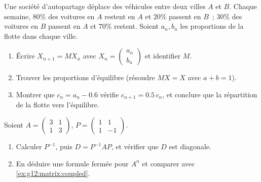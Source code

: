 \begin{exercise}[$\star\star$]\label{exo:g12:matrix:7}
Une société d'autopartage déplace des véhicules entre deux villes $A$ et
$B$. Chaque semaine, $80\%$ des voitures en $A$ restent en $A$ et $20\%$
passent en $B$~; $30\%$ des voitures en $B$ passent en $A$ et $70\%$ restent.
Soient $a_n, b_n$ les proportions de la flotte dans chaque ville.
\begin{omfigure}
\end{omfigure}
\begin{enumerate}
  \item Écrire $X_{n+1} = MX_n$ avec
        $X_n = \begin{pmatrix} a_n\\ b_n\end{pmatrix}$ et identifier $M$.
  \item Trouver les proportions d'équilibre (résoudre $MX = X$ avec
        $a + b = 1$).
  \item Montrer que $c_n = a_n - 0.6$ vérifie $c_{n+1} = 0.5\,c_n$, et
        conclure que la répartition de la flotte  vers l'équilibre.
\end{enumerate}
\end{exercise}

\begin{exercise}[$\star\star\star$]\label{exo:g12:matrix:8}
Soient $A = \begin{pmatrix} 3 & 1\\ 1 & 3 \end{pmatrix}$,
$P = \begin{pmatrix} 1 & 1\\ 1 & -1 \end{pmatrix}$.
\begin{enumerate}
  \item Calculer $P^{-1}$, puis $D = P^{-1}AP$, et vérifier que $D$ est
        diagonale.
  \item En déduire une formule fermée pour $A^n$ et comparer avec
        \cref{ex:g12:matrix:coupled}.
\end{enumerate}
\end{exercise}

